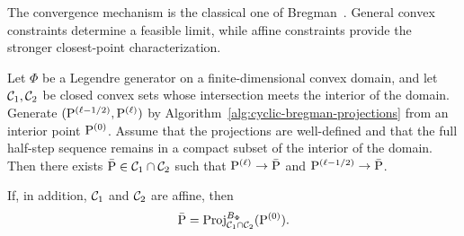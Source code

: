 The convergence mechanism is the classical one of Bregman~\cite{bregman1967relaxation}. General convex constraints determine a feasible limit, while affine constraints provide the stronger closest-point characterization.

\begin{prop}\label{prop-cyclic-kl-affine}
	Let $\Phi$ be a Legendre generator on a finite-dimensional convex domain, and let $\Cc_1,\Cc_2$ be closed convex sets whose intersection meets the interior of the domain. Generate $(\P^{(\ell-1/2)},\P^{(\ell)})$ by Algorithm~\ref{alg:cyclic-bregman-projections} from an interior point $\P^{(0)}$. Assume that the projections are well-defined and that the full half-step sequence remains in a compact subset of the interior of the domain. Then there exists $\bar\P\in\Cc_1\cap\Cc_2$ such that $\P^{(\ell)}\to\bar\P$ and $\P^{(\ell-1/2)}\to\bar\P$.

	If, in addition, $\Cc_1$ and $\Cc_2$ are affine, then
	\[
		\bar\P
		=
		\Proj_{\Cc_1\cap\Cc_2}^{B_\Phi}(\P^{(0)}).
	\]
\end{prop}
